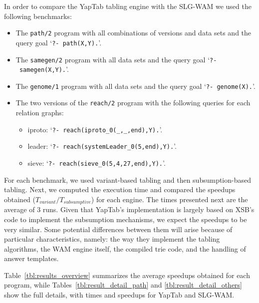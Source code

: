 In order to compare the YapTab tabling engine with the SLG-WAM we used the following benchmarks:

\begin{itemize}
   \item The \texttt{path/2} program with all combinations of versions and data sets and the query goal `\texttt{?-~path(X,Y).}'.
   
   \item The \texttt{samegen/2} program with all data sets and the query goal `\texttt{?-~samegen(X,Y).}'.
   
   \item The \texttt{genome/1} program with all data sets and the query goal `\texttt{?-~genome(X).}'.
   
   \item The two versions of the \texttt{reach/2} program with the following queries for each relation graphs:

   \begin{itemize}
      \item iproto: `\texttt{?-~reach(iproto\_0(\_,\_,end),Y).}'.
      \item leader: `\texttt{?-~reach(systemLeader\_0(5,end),Y).}'.
      \item sieve: `\texttt{?-~reach(sieve\_0(5,4,27,end),Y).}'.
   \end{itemize}

\end{itemize}

For each benchmark, we used variant-based tabling and then subsumption-based tabling.
Next, we computed the execution time and compared the speedups obtained ($T_{variant} / T_{subsumptive}$) for
each engine. The times presented next are the average of 3 runs. Given that YapTab's implementation
is largely based on XSB's code to implement the subsumption mechanisms,
we expect the speedups to be very similar. Some potential differences between them will arise because
of particular characteristics, namely: the way they implement the tabling algorithms, the WAM engine itself,
the compiled trie code, and the handling of answer templates.

Table~\ref{tbl:results_overview} summarizes the average speedups obtained for each program,
while Tables~\ref{tbl:result_detail_path} and \ref{tbl:result_detail_others}
show the full details, with times and speedups for YapTab and SLG-WAM.

